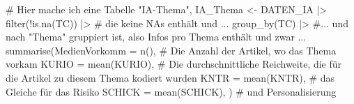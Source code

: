 \documentclass[twoside, pagesize, fontsize=11pt, dvipsnames]{scrreport}
\newenvironment{Shaded}{\begin{snugshade}}{\end{snugshade}}
\newcommand{\AttributeTok}[1]{\textcolor[rgb]{0.40,0.45,0.13}{#1}}
\newcommand{\CommentTok}[1]{\textcolor[rgb]{0.37,0.37,0.37}{#1}}
\newcommand{\FunctionTok}[1]{\textcolor[rgb]{0.28,0.35,0.67}{#1}}
\newcommand{\NormalTok}[1]{\textcolor[rgb]{0.00,0.23,0.31}{#1}}
\newcommand{\OtherTok}[1]{\textcolor[rgb]{0.00,0.23,0.31}{#1}}
\newcommand{\SpecialCharTok}[1]{\textcolor[rgb]{0.37,0.37,0.37}{#1}}
\begin{document}
\begin{Shaded}
\begin{Highlighting}[]

\CommentTok{\# Hier mache ich eine Tabelle "IA{-}Thema", }
\NormalTok{IA\_Thema }\OtherTok{\textless{}{-}}\NormalTok{ DATEN\_IA }\SpecialCharTok{|\textgreater{}} 
  \FunctionTok{filter}\NormalTok{(}\SpecialCharTok{!}\FunctionTok{is.na}\NormalTok{(TC)) }\SpecialCharTok{|\textgreater{}} \CommentTok{\# die keine NAs enthält und ...}
  \FunctionTok{group\_by}\NormalTok{(TC) }\SpecialCharTok{|\textgreater{}} \CommentTok{\#... und nach "Thema" gruppiert ist, also Infos pro Thema enthält und zwar ...}
  \FunctionTok{summarise}\NormalTok{(}\AttributeTok{MedienVorkomm =} \FunctionTok{n}\NormalTok{(), }\CommentTok{\# Die Anzahl der Artikel, wo das Thema vorkam}
            \AttributeTok{KURIO =} \FunctionTok{mean}\NormalTok{(KURIO),   }\CommentTok{\# Die durchschnittliche Reichweite, die für die Artikel zu diesem Thema kodiert wurden}
            \AttributeTok{KNTR =} \FunctionTok{mean}\NormalTok{(KNTR),   }\CommentTok{\# das Gleiche für das Risiko}
            \AttributeTok{SCHICK =} \FunctionTok{mean}\NormalTok{(SCHICK), }
\NormalTok{            )   }\CommentTok{\# und Personalisierung }


\end{Highlighting}
\end{Shaded}
\end{document}
